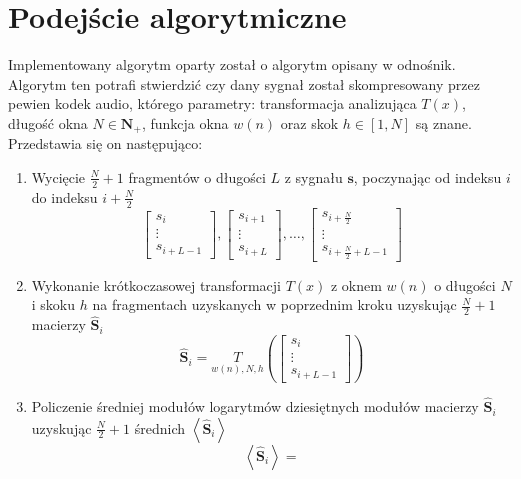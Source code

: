 \documentclass[pl,12pt]{aghdpl}
\let\Oldsection\section%
\renewcommand{\section}{\FloatBarrier\Oldsection}
\begin{document}
\section{Podejście algorytmiczne}
Implementowany algorytm oparty został o algorytm opisany w
{\color{red}odnośnik}. Algorytm ten potrafi stwierdzić czy dany sygnał został
skompresowany przez pewien kodek audio, którego parametry: transformacja
analizująca $T(x)$, długość okna $N \in \bm N_+$, funkcja okna $w(n)$ oraz skok
$h \in \left[1, N\right]$ są znane.
Przedstawia się on następująco:
\begin{enumerate}
  \item Wycięcie $\frac{N}{2}+1$ fragmentów o długości $L$ z sygnału $\bm s$,
    poczynając od indeksu $i$ do indeksu $i+\frac{N}{2}$
    \begin{equation}
      \begin{bmatrix}
        s_i \\\vdots\\ s_{i+L-1}
      \end{bmatrix},
      \begin{bmatrix}
        s_{i+1} \\\vdots\\ s_{i+L}
      \end{bmatrix}, \dotsc,
      \begin{bmatrix}
        s_{i+\frac{N}{2}} \\\vdots\\ s_{i+\frac{N}{2}+L-1}
      \end{bmatrix}
    \end{equation}
  \item Wykonanie krótkoczasowej transformacji $T(x)$ z oknem $w(n)$ o długości
    $N$ i skoku $h$ na fragmentach uzyskanych w poprzednim kroku uzyskując
    $\frac{N}{2}+1$ macierzy $\hat{\bm S}_i$
    \begin{equation}
      \hat{\bm S}_i = \underset{w(n), N, h}{T}\left(
        \begin{bmatrix}
          s_i \\\vdots\\ s_{i+L-1}
        \end{bmatrix}\right)
    \end{equation}
  \item Policzenie średniej modułów logarytmów dziesiętnych modułów macierzy
    $\hat{\bm S}_i$ uzyskując $\frac{N}{2}+1$ średnich $\left<\hat{\bm S}_i\right>$
    \begin{equation}
      \left<\hat{\bm S}_i\right> =

\end{equation}
\end{enumerate}
\end{document}
